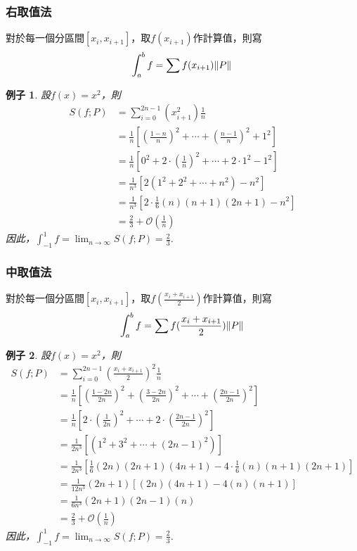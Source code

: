 \documentclass[12pt]{article}
\newtheorem*{example}{例子}
\begin{document}
    \subsubsection*{右取值法}

    對於每一個分區間$[x_i,x_{i+1}]$，取$f(x_{i+1})$作計算值，則寫$$\int_a^b f=\sum f(x_{i+1})\norm*{P}$$

    \begin{example}
        設$f(x)=x^2$，則\begin{align*}
            S(f;P)&=\sum_{i=0}^{2n-1} (x_{i+1}^2) \frac{1}{n}\\
            &=\frac{1}{n}[(\frac{1-n}{n})^2+\cdots+(\frac{n-1}{n})^2+1^2]\\
            &=\frac{1}{n}[0^2+2\cdot (\frac{1}{n})^2+\cdots+2\cdot 1^2 - 1^2]\\
            &=\frac{1}{n^3}[2(1^2+2^2+\cdots +n^2)-n^2]\\
            &=\frac{1}{n^3}[2\cdot \frac{1}{6}(n)(n+1)(2n+1)-n^2]\\
            &=\frac{2}{3}+\mathcal{O}(\frac{1}{n})
        \end{align*}
        因此，$\displaystyle\int_{-1}^1 f = \lim_{n\to \infty}S(f;P)=\frac{2}{3}$.
    \end{example}
    \subsubsection*{中取值法}

    對於每一個分區間$[x_i,x_{i+1}]$，取$f(\frac{x_i+x_{i+1}}{2})$作計算值，則寫$$\int_a^b f=\sum f(\frac{x_i+x_{i+1}}{2})\norm*{P}$$

    \begin{example}
        設$f(x)=x^2$，則\begin{align*}
            S(f;P)&=\sum_{i=0}^{2n-1} (\frac{x_i+x_{i+1}}{2})^2 \frac{1}{n}\\
            &=\frac{1}{n}[(\frac{1-2n}{2n})^2+(\frac{3-2n}{2n})^2+\cdots+(\frac{2n-1}{2n})^2]\\
            &=\frac{1}{n}[2\cdot (\frac{1}{2n})^2+\cdots+2\cdot (\frac{2n-1}{2n})^2]\\
            &=\frac{1}{2n^3}[(1^2+3^2+\cdots +(2n-1)^2)]\\
            &=\frac{1}{2n^3}[\frac{1}{6}(2n)(2n+1)(4n+1)-4\cdot\frac{1}{6}(n)(n+1)(2n+1)]\\
            &=\frac{1}{12n^3}(2n+1)[(2n)(4n+1)-4(n)(n+1)]\\
            &=\frac{1}{6n^3}(2n+1)(2n-1)(n)\\
            &=\frac{2}{3}+\mathcal{O}(\frac{1}{n})
        \end{align*}
        因此，$\displaystyle\int_{-1}^1 f = \lim_{n\to \infty}S(f;P)=\frac{2}{3}$.
    \end{example}
\end{document}
